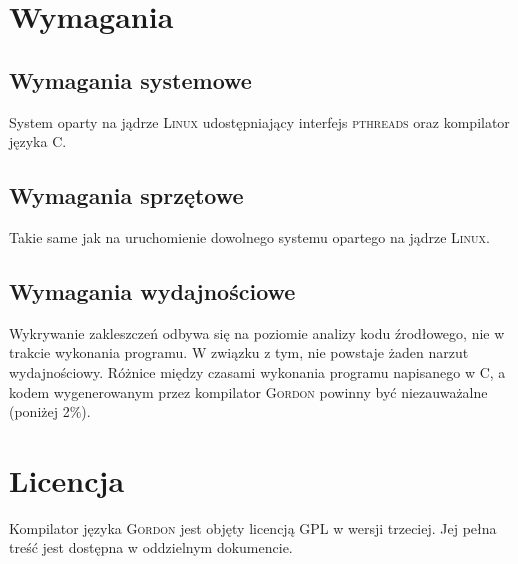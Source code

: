 \documentclass{documentation}
\begin{document}
\section{Wymagania}
\subsection{Wymagania systemowe}
\noindent System oparty na jądrze \textsc{Linux} udostępniający interfejs \textsc{pthreads} oraz kompilator języka C.

\subsection{Wymagania sprzętowe}
\noindent Takie same jak na uruchomienie dowolnego systemu opartego na jądrze \textsc{Linux}.

\subsection{Wymagania wydajnościowe}
\noindent Wykrywanie zakleszczeń odbywa się na poziomie analizy kodu źrodłowego, nie w trakcie wykonania programu. W związku z tym, nie powstaje żaden narzut wydajnościowy. Różnice między czasami wykonania programu napisanego w C, a kodem wygenerowanym przez kompilator \textsc{Gordon} powinny być niezauważalne (poniżej 2\%).

\section{Licencja}
\noindent Kompilator języka \textsc{Gordon} jest objęty licencją GPL w wersji trzeciej. Jej pełna treść jest dostępna w oddzielnym dokumencie.
\end{document}
